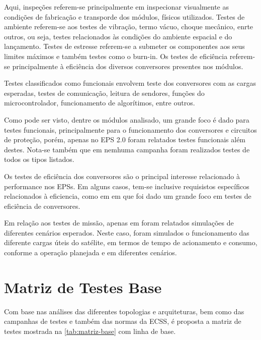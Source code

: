 Aqui, inspeções referem-se principalmente em inspecionar visualmente as condições de fabricação e transporde dos módulos, físicos utilizados.
Testes de ambiente referem-se aos testes de vibração, termo vácuo, choque mecânico, enrte outros, ou seja, testes relacionados às condições do ambiente espacial e do lançamento.
Testes de estresse referem-se a submeter os componentes aos seus limites máximos e também testes como o burn-in.
Os testes de eficiência referem-se principalmente à eficiência dos diversos conversores presentes nos módulos.

Testes classificados como funcionais envolvem teste dos conversores com as cargas esperadas, testes de comunicação, leitura de sendores, funções do microcontrolador, funcionamento de algorítimos, entre outros.

Como pode ser visto, dentre os módulos analisado, um grande foco é dado para testes funcionais, principalmente para o funcionamento dos conversores e circuitos de proteção, porém, apenas no EPS 2.0 foram relatados testes funcionais além destes.
Nota-se também que em nemhuma campanha foram realizados testes de todos os tipos listados.

Os testes de eficiência dos conversores são o principal interesse relacionado à performance nos \gls{EPS}s.
Em alguns casos, tem-se inclusive requisistos específicos relacionados à eficiencia, como em \textcite{aalto-eps} em que foi dado um grande foco em testes de eficiência de conversores.

Em relação aos testes de missão, apenas em \textcite{mist-eps} foram relatados simulações de diferentes cenários esperados.
Neste caso, foram simulados o funcionamento das diferente cargas úteis do satélite, em termos de tempo de acionamento e consumo, conforme a operação planejada e em diferentes cenários.


\section{Matriz de Testes Base} \label{sec:matriz-base}


Com base nas análises das diferentes topologias e arquiteturas, bem como das campanhas de testes e também das normas da \gls{ECSS}, é proposta a matriz de testes mostrada na \autoref{tab:matriz-base} com linha de base.


